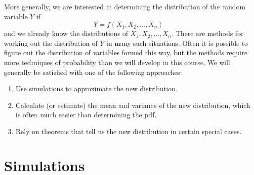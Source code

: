 \documentclass[twoside]{book}\usepackage[]{graphicx}\usepackage[]{xcolor}
\begin{document}
More generally, we are interested in determining the distribution of the random 
variable $Y$ if 
\[Y = f(X_1, X_2, \dots, X_n)\]
and we already know the distributions of $X_1, X_2, \dots, X_n$.
There are methods for working out the distribution of $Y$ in many such situations, 
Often it is possible to figure out the distribution of variables formed this way,
but the methods require more techniques of probability than we will develop in this 
course.  We will generally be satisfied with one of the following approaches:
\begin{enumerate}
	\item
		Use simulations to approximate the new distribution.
	\item
		Calculate (or estimate) the mean and variance of the new distribution,
		which is often much easier than determining the pdf.
	\item
		Rely on theorems that tell us the new distribution in certain special
		cases.
\end{enumerate}

\section{Simulations}
\end{document}
